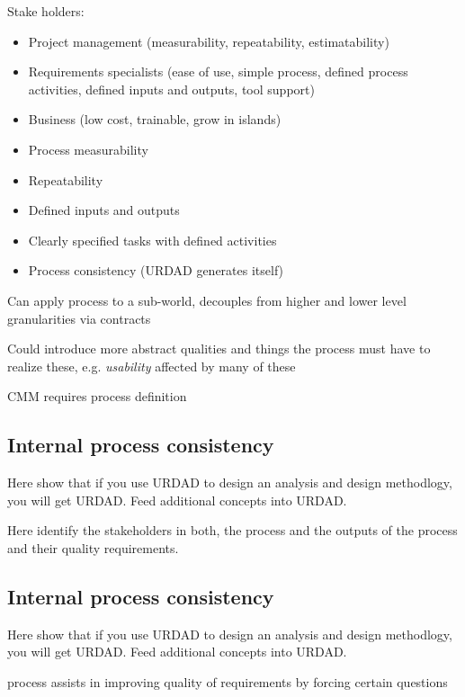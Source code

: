 \cite{berard_what_1995}

Stake holders:
\begin{itemize}
  \item Project management (measurability, repeatability, estimatability)
  \item Requirements specialists (ease of use, simple process, defined process activities, defined inputs and outputs, tool support)
  \item Business (low cost, trainable, grow in islands)
\end{itemize}


\begin{itemize}
  \item Process measurability
  \item Repeatability
  \item Defined inputs and outputs
  \item Clearly specified tasks with defined activities
  \item Process consistency (URDAD generates itself)
\end{itemize}

Can apply process to a sub-world, decouples from higher and lower level granularities via contracts

Could introduce more abstract qualities and things the process must have to realize these, e.g. \emph{usability} affected by many of these

CMM requires process definition


\subsection{Internal process consistency}


Here show that if you use URDAD to design an analysis and design methodlogy, you will get URDAD. Feed additional concepts into URDAD.

Here identify the stakeholders in both, the process and the outputs of the process and their quality requirements.


\subsection{Internal process consistency}

Here show that if you use URDAD to design an analysis and design methodlogy, you will get URDAD. Feed additional concepts into URDAD.

process assists in improving quality of requirements by forcing certain questions
